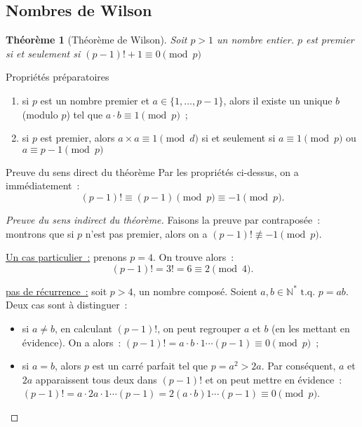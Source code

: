 \documentclass[10pt, mathserif]{beamer}
\newcommand{\tq}{\text{ t.q. }}
\newcommand{\N}{\mathbb N}
\newtheorem{thm}{Théorème}[section]
\theoremstyle{definition}
\theoremstyle{remark}
\begin{document}
	\subsection{Nombres de Wilson}
	\begin{frame}
		\begin{thm}[Théorème de Wilson]
			Soit $p > 1$ un nombre entier. $p$ est premier si et seulement si $(p-1)! + 1 \equiv 0 \pmod p$
		\end{thm}

		\begin{block}{Propriétés préparatoires}
			\begin{enumerate}
				\item si $p$ est un nombre premier et $a \in \{1, \dotsc, p-1\}$, alors il existe un unique $b$ (modulo $p$) tel que $a \cdot b \equiv 1 \pmod p$~;
				\item si $p$ est premier, alors $a \times a \equiv 1 \pmod d$ si et seulement si $a \equiv 1 \pmod p$ ou $a \equiv p-1 \pmod p$
			\end{enumerate}
		\end{block}

		\begin{block}{Preuve du sens direct du théorème}
			Par les propriétés ci-dessus, on a immédiatement~:
			\[(p-1)! \equiv (p-1) \pmod p \equiv -1 \pmod p.\]
		\end{block}
	\end{frame}

	\begin{frame}
		\begin{proof}[Preuve du sens indirect du théorème]
			Faisons la preuve par contraposée~: montrons que si $p$ n'est pas premier, alors on a $(p-1)! \not \equiv -1 \pmod p$.

			\underline{Un cas particulier~:} prenons $p = 4$. On trouve alors~:
			\[(p-1)! = 3! = 6 \equiv 2 \pmod 4.\]

			\underline{pas de récurrence~:} soit $p > 4$, un nombre composé. Soient $a, b \in \N^* \tq p = ab$. Deux cas sont à distinguer~:
			\begin{itemize}
				\item si $a \neq b$, en calculant $(p-1)!$, on peut regrouper $a$ et $b$ (en les mettant en évidence). On a alors~:
				$(p-1)! = a \cdot b \cdot 1 \dotsm (p-1) \equiv 0 \pmod p$~;
				\item si $a = b$, alors $p$ est un carré parfait tel que $p = a^2 > 2a$. Par conséquent, $a$ et $2a$ apparaissent tous deux dans $(p-1)!$
				et on peut mettre en évidence~: $(p-1)! = a \cdot 2a \cdot 1 \dotsm (p-1) = 2(a \cdot b)1 \dotsm (p-1) \equiv 0 \pmod p$.
			\end{itemize}
		\end{proof}
	\end{frame}
	
\end{document}
